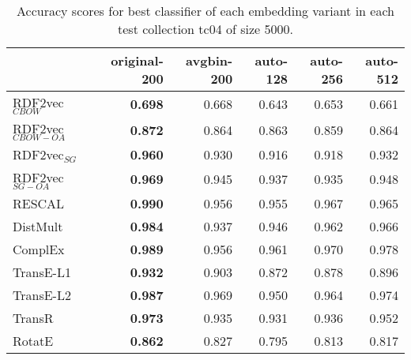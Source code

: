 \documentclass[11pt,titlepage,oneside,openany]{book}
\begin{document}
\begin{table}[h!]
\centering
\begin{tabular}{lrrrrr}
\toprule
{} &  original-200 &  avgbin-200 &  auto-128 &  auto-256 &  auto-512 \\
\midrule
RDF2vec$_{CBOW}$     &	\textbf{0.698} &       0.668  &     0.643  &     0.653  &     0.661  \\
RDF2vec$_{CBOW-OA}$  &	\textbf{0.872} &       0.864  &     0.863  &     0.859  &     0.864  \\
RDF2vec$_{SG}$       &	\textbf{0.960} &       0.930  &     0.916  &     0.918  &     0.932  \\
RDF2vec$_{SG-OA}$    &	\textbf{0.969} &       0.945  &     0.937  &     0.935  &     0.948  \\
RESCAL               &	\textbf{0.990} &       0.956  &     0.955  &     0.967  &     0.965  \\
DistMult             &	\textbf{0.984} &       0.937  &     0.946  &     0.962  &     0.966  \\
ComplEx              &	\textbf{0.989} &       0.956  &     0.961  &     0.970  &     0.978  \\
TransE-L1            &	\textbf{0.932} &       0.903  &     0.872  &     0.878  &     0.896  \\
TransE-L2            &	\textbf{0.987} &       0.969  &     0.950  &     0.964  &     0.974  \\
TransR               &	\textbf{0.973} &       0.935  &     0.931  &     0.936  &     0.952  \\
RotatE               &	\textbf{0.862} &       0.827  &     0.795  &     0.813  &     0.817  \\
\bottomrule
\end{tabular}
\caption{Accuracy scores for best classifier of each embedding variant in each test collection tc04 of size 5000.}
\label{tab:dlcc-acc-tc04-5000}
\end{table}
\end{document}
